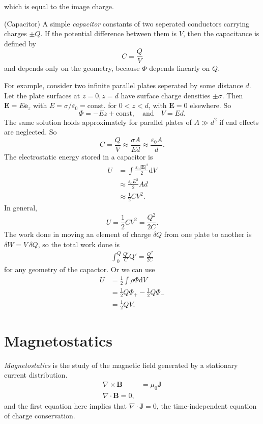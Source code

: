 \documentclass{article}
\begin{document}
which is equal to the image charge.
\begin{definition}
	(Capacitor) A simple \textit{capacitor} constants of two seperated conductors carrying charges $ \pm Q $. If the potential difference between them is $ V $, then the capacitance is defined by
	\[
	  C = \frac QV
	\]
	and depends only on the geometry, because $ \Phi $ depends linearly on $ Q $.
\end{definition}
For example, consider two infinite parallel plates seperated by some distance $ d $. Let the plate surfaces at $ z=0, z=d $ have surface charge densities $ \pm \sigma $. Then $ \mathbf E = E \mathbf e_z $ with $ E= \sigma/\varepsilon_0  = \text{const.}$ for $ 0<z<d $, with $ \mathbf E = 0 $ elsewhere. So
\[
	\Phi = -Ez + \text{const},\quad\text{and}\quad V = Ed.
\]
The same solution holds approximately for parallel plates of $ A\gg d^2 $ if end effects are neglected. So 
\[
	C= \frac QV\approx \frac{\sigma A} {Ed}\approx \frac{\varepsilon_0 A}d.
\]
The electrostatic energy stored in a capacitor is
\begin{align*}
	U &= \int \frac{\varepsilon_0 |\mathbf E|^2}2 \mathrm dV\\
	  &\approx \frac{\varepsilon_0 E^2}2 Ad\\
	  &\approx \frac 12 C V^2.
\end{align*}
In general,
\[
	U = \frac 12 CV^2 = \frac {Q^2}{2C}.
\]
The work done in moving an element of charge $ \delta Q $ from one plate to another is $ \delta W = V\ \delta Q $, so the total work done is
\begin{align*}
	\int_0^Q \frac{Q'}C \mathrm Q' = \frac{Q^2}{2C}
\end{align*}
for any geometry of the capactor. Or we can use
\begin{align*}
	U &= \frac 12 \int \rho \Phi \mathrm dV\\
	  &= \frac 12 Q \Phi_+ - \frac 12 Q \Phi_-\\
	  &= \frac 12 QV.
\end{align*}
\section{Magnetostatics}
\textit{Magnetostatics} is the study of the magnetic field generated by a stationary current distribution.
\begin{align*}
	\nabla\times \mathbf B &= \mu_0 \mathbf J\\
	\nabla\cdot\mathbf B = 0,
\end{align*}
and the first equation here implies that $ \nabla\cdot\mathbf J = 0 $, the time-independent equation of charge conservation.
\end{document}
